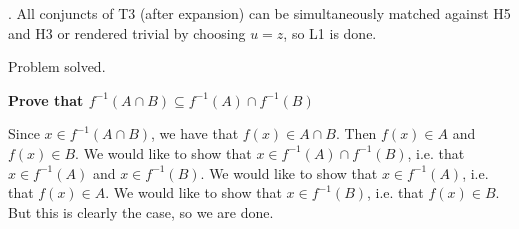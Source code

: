 \documentclass[a4paper,twoside,12pt]{article} %
\makeatletter
\DeclareRobustCommand{\_}{%
  \leavevmode\vbox{%
    \hrule\@width.4em
          \@height-.16ex
          \@depth\dimexpr.16ex+.28pt\relax}}
\newenvironment{fit}{\begin{adjustbox}{max width=\textwidth,max totalheight=\textheight,keepaspectratio}}{\end{adjustbox}}
\makeatother
\begin{document}
\begin{steps}
. All conjuncts of T3 (after expansion) can be simultaneously matched against H5 and H3 or rendered trivial by choosing $u = z$, so L1 is done.\nopagebreak[4] 
\nopagebreak[4] 
\smallskip\nopagebreak[4] 

\begin{fit}%
\end{fit}

Problem solved.
\cleardoublepage

\end{steps}
{\begin{center} \large \textbf{Prove that $f^{-1}(A \cap B) \subseteq f^{-1}(A) \cap f^{-1}(B)$}\end{center}}\nopagebreak[4]

\begin{center}
\begin{minipage}{120mm}
Since $x\in f^{-1}(A\cap B)$, we have that $f(x)\in A\cap B$. Then $f(x)\in A$ and $f(x)\in B$. We would like to show that $x\in f^{-1}(A)\cap f^{-1}(B)$, i.e. that $x\in f^{-1}(A)$ and $x\in f^{-1}(B)$. We would like to show that $x\in f^{-1}(A)$, i.e. that $f(x)\in A$. We would like to show that $x\in f^{-1}(B)$, i.e. that $f(x)\in B$. But this is clearly the case, so we are done.
\end{minipage}
\end{center}
\end{document}
